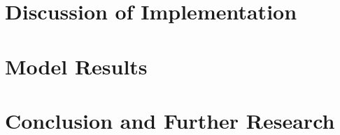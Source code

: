 \documentclass[10pt,a4paper, hidelinks]{article} %
\begin{document}
\section{Discussion of Implementation}

\section{Model Results}

\section{Conclusion and Further Research}
\end{document}
